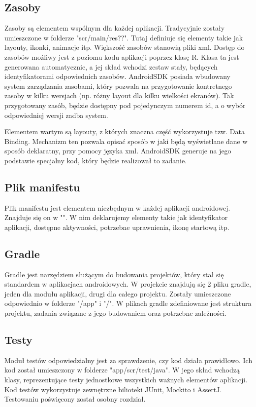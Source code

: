 \documentclass	{xmgr}
\begin{document}
\subsection{Zasoby}
Zasoby są elementem wspólnym dla każdej aplikacji. Tradycyjnie zostały umieszczone w folderze "scr/main/res??". Tutaj definiuje się elementy takie jak layouty, ikonki, animacje itp. Większość zasobów stanowią pliki xml. Dostęp do zasobów możliwy jest z poziomu kodu aplikacji poprzez klasę R. Klasa ta jest generowana automatycznie, a jej skład wchodzi zestaw stały, będących identyfikatorami odpowiednich zasobów. AndroidSDK posiada wbudowany system zarządzania zasobami, który pozwala na przygotowanie kontretnego zasoby w kilku wersjach (np. różny layout dla kilku wielkości ekranów). 
Tak przygotowany zasób, będzie dostępny pod pojedynczym numerem id, a o wybór odpowiedniej wersji zadba system.

Elementem wartym są layouty, z których znaczna część wykorzystuje tzw. Data Binding. Mechanizm ten pozwala opisać sposób w jaki będą wyświetlane dane w sposób deklaratny, przy pomocy języka xml. AndroidSDK generuje na jego podstawie specjalny kod, który będzie realizował to zadanie. 


\subsection{Plik manifestu}
Plik manifestu jest elementem niezbędnym w każdej aplikacji androidowej. Znajduje się on w "". W nim deklarujemy elementy takie jak identyfikator aplikacji, dostępne aktywności, potrzebne uprawnienia, ikonę startową itp.

\subsection{Gradle}
Gradle jest narzędziem służącym do budowania projektów, który stał się standardem w aplikacjach androidowych. W projekcie znajdują się 2 pliku gradle, jeden dla modułu aplikacji, drugi dla całego projektu. Zostały umieszczone odpowiednio w folderze "/app" i "/". W plikach gradle zdefiniowane jest struktura projektu, zadania związane z jego budowaniem oraz potrzebne zależności.

\subsection{Testy}
Moduł testów odpowiedzialny jest za sprawdzenie, czy kod działa prawidłowo. Ich kod został umieszczony w folderze "app/scr/test/java". W jego skład wchodzą klasy, reprezentujące testy jednostkowe wszystkich ważnych elementów aplikacji. Kod testów wykorzystuje zewnętrzne bilioteki JUnit, Mockito i AssertJ. Testowaniu poświęcony został osobny rozdział.
\end{document}
